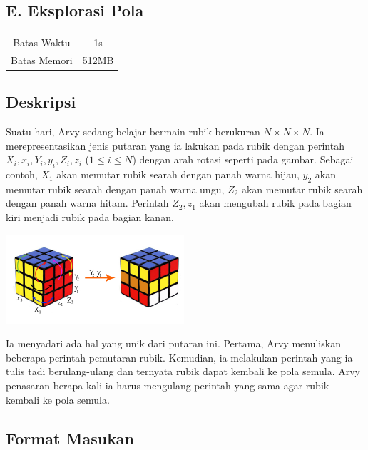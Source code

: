 \documentclass{article}
\begin{document}
\begin{center}
    \section*{E. Eksplorasi Pola}

    \begin{tabular}{ | c c | }
        \hline
        Batas Waktu  & 1s \\
        Batas Memori & 512MB \\
        \hline
    \end{tabular}
\end{center}

\subsection*{Deskripsi}

Suatu hari, Arvy sedang belajar bermain rubik berukuran $N \times N \times N$.
Ia merepresentasikan jenis putaran yang ia lakukan pada rubik dengan perintah $X_i, x_i, Y_i, y_i, Z_i, z_i$ ($1 \leq i \leq N$) dengan arah rotasi seperti pada gambar.
Sebagai contoh, $X_1$ akan memutar rubik searah dengan panah warna hijau, $y_2$ akan memutar rubik searah dengan panah warna ungu, $Z_2$ akan memutar rubik searah dengan panah warna hitam.
Perintah $Z_2, z_1$ akan mengubah rubik pada bagian kiri menjadi rubik pada bagian kanan.

\begin{center}
    \includegraphics[width=250px]{rubic}
\end{center}

Ia menyadari ada hal yang unik dari putaran ini.
Pertama, Arvy menuliskan beberapa perintah pemutaran rubik.
Kemudian, ia melakukan perintah yang ia tulis tadi berulang-ulang dan ternyata rubik dapat kembali ke pola semula.
Arvy penasaran berapa kali ia harus mengulang perintah yang sama agar rubik kembali ke pola semula.

\subsection*{Format Masukan}
\end{document}
